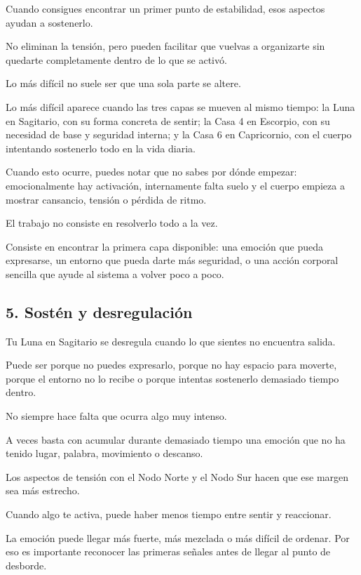\documentclass[11pt,a4paper]{article}
\begin{document}
Cuando consigues encontrar un primer punto de estabilidad, esos aspectos ayudan a sostenerlo.

No eliminan la tensión, pero pueden facilitar que vuelvas a organizarte sin quedarte completamente dentro de lo que se activó.

Lo más difícil no suele ser que una sola parte se altere.

Lo más difícil aparece cuando las tres capas se mueven al mismo tiempo:
la Luna en Sagitario, con su forma concreta de sentir;
la Casa 4 en Escorpio, con su necesidad de base y seguridad interna;
y la Casa 6 en Capricornio, con el cuerpo intentando sostenerlo todo en la vida diaria.

Cuando esto ocurre, puedes notar que no sabes por dónde empezar: emocionalmente hay activación, internamente falta suelo y el cuerpo empieza a mostrar cansancio, tensión o pérdida de ritmo.

El trabajo no consiste en resolverlo todo a la vez.

Consiste en encontrar la primera capa disponible: una emoción que pueda expresarse, un entorno que pueda darte más seguridad, o una acción corporal sencilla que ayude al sistema a volver poco a poco.

\subsection{5. Sostén y desregulación}

Tu Luna en Sagitario se desregula cuando lo que sientes no encuentra salida.

Puede ser porque no puedes expresarlo, porque no hay espacio para moverte, porque el entorno no lo recibe o porque intentas sostenerlo demasiado tiempo dentro.

No siempre hace falta que ocurra algo muy intenso.

A veces basta con acumular durante demasiado tiempo una emoción que no ha tenido lugar, palabra, movimiento o descanso.

Los aspectos de tensión con el Nodo Norte y el Nodo Sur hacen que ese margen sea más estrecho.

Cuando algo te activa, puede haber menos tiempo entre sentir y reaccionar.

La emoción puede llegar más fuerte, más mezclada o más difícil de ordenar. Por eso es importante reconocer las primeras señales antes de llegar al punto de desborde.
\end{document}
